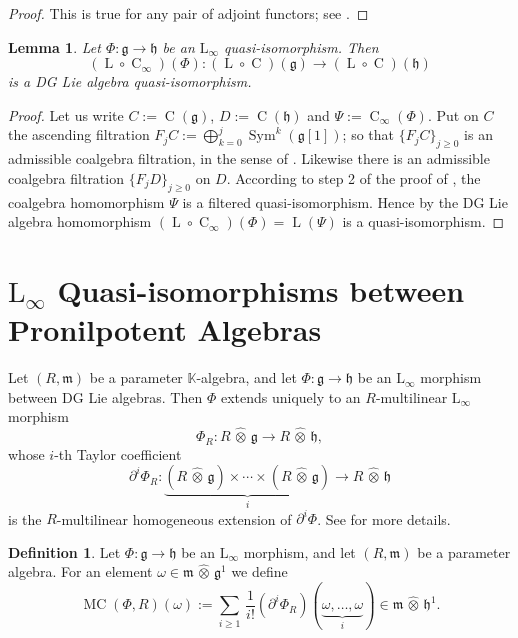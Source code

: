 \documentclass[a4paper,10pt]{amsart}
\newtheorem{lem}[equation]{Lemma}
\theoremstyle{definition}
\newtheorem{dfn}[equation]{Definition}
\numberwithin{equation}{section}
\newcommand{\opn}{\operatorname}
\newcommand{\mfrak}[1]{\mathfrak{#1}}
\newcommand{\mrm}[1]{\mathrm{#1}}
\newcommand{\mbb}[1]{\mathbb{#1}}
\newcommand{\smfrac}[2]{\textstyle \frac{#1}{#2}}
\newcommand{\boplus}{\bigoplus\nolimits}
\newcommand{\what}[1]{\widehat{#1}}
\newcommand{\hatotimes}{\, \what{\otimes} \,}
\newcommand{\hot}{\hatotimes}
\newcommand{\K}{\mbb{K}}
\newcommand{\g}{\mfrak{g}}
\newcommand{\m}{\mfrak{m}}
\newcommand{\h}{\mfrak{h}}
\newcommand{\om}{\omega}
\begin{document}
\begin{proof}
This is true for any pair of adjoint functors; see 
\cite[Section IV.1 Theorem 1]{Ma}.
\end{proof}

\begin{lem} \label{lem:21}
Let $\Phi : \g \to \h$ be an $\mrm{L}_{\infty}$ quasi-isomorphism. Then 
\[ (\opn{L} \circ \opn{C}_{\infty})(\Phi) : 
(\opn{L} \circ \opn{C})(\g) \to (\opn{L} \circ \opn{C})(\h) \]
is a DG Lie algebra quasi-isomorphism.
\end{lem}

\begin{proof}
Let us write
$C := \opn{C}(\g)$, $D := \opn{C}(\h)$ and $\Psi := \opn{C}_{\infty}(\Phi)$. 
Put on $C$ the ascending filtration 
$F_j C := \boplus_{k = 0}^j \opn{Sym}^k(\g[1])$; 
so that $\{ F_j C \}_{j \geq 0}$ is an admissible coalgebra filtration, in the
sense of \cite[Definition 4.4.1]{Hi2}. Likewise there is an 
admissible coalgebra filtration $\{ F_j D \}_{j \geq 0}$ on $D$.
According to step 2 of the proof of \cite[Proposition 4.4.3]{Hi2}, the
coalgebra homomorphism $\Psi$ is a filtered quasi-isomorphism. 
Hence by \cite[Proposition 4.4.4]{Hi2} the DG Lie algebra homomorphism 
$(\opn{L} \circ \opn{C}_{\infty})(\Phi) = \opn{L}(\Psi)$
is a quasi-isomorphism.
\end{proof}






\section{$\mrm{L}_{\infty}$ Quasi-isomorphisms between Pronilpotent Algebras}
\label{sec:L-infty-cplt}

Let $(R, \m)$ be a parameter $\K$-algebra, and let
$\Phi : \g \to \h$ be an $\mrm{L}_{\infty}$ morphism between DG Lie algebras. 
Then $\Phi$ extends uniquely to an $R$-multilinear $\mrm{L}_{\infty}$ morphism 
\[ \Phi_{R} : R \hot \g \to R \hot \h , \]
whose $i$-th Taylor coefficient
\[ \partial^i \Phi_{R} :
\underset{i}{\underbrace{(R \hot \g) \times \cdots \times 
(R \hot \g)}} \to R \hot \h \]
is the $R$-multilinear homogeneous extension of 
$\partial^i \Phi$. See \cite[Section 3]{Ye2} for more details. 

\begin{dfn} \label{dfn:6}
Let $\Phi : \g \to \h$ be an $\mrm{L}_{\infty}$ morphism, and let 
$(R, \m)$ be a parameter algebra. For an element 
$\om \in \m \hot \g^1$ we define
\[ \opn{MC}(\Phi, R)(\om) := 
\sum_{i \geq 1} \, \smfrac{1}{i!} (\partial^i \Phi_{R})
(\underset{i}{\underbrace{\om, \ldots, \om}}) \in \m \hot \h^1 . \]
\end{dfn}
\end{document}
